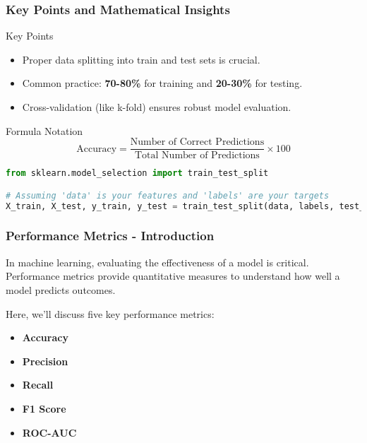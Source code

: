 \documentclass[aspectratio=169]{beamer}
\begin{document}
\begin{frame}[fragile]
    \frametitle{Key Points and Mathematical Insights}
    \begin{block}{Key Points}
        \begin{itemize}
            \item Proper data splitting into train and test sets is crucial.
            \item Common practice: \textbf{70-80\%} for training and \textbf{20-30\%} for testing.
            \item Cross-validation (like k-fold) ensures robust model evaluation.
        \end{itemize}
    \end{block}
    
    \begin{block}{Formula Notation}
        \begin{equation}
            \text{Accuracy} = \frac{\text{Number of Correct Predictions}}{\text{Total Number of Predictions}} \times 100
        \end{equation}
        
        \begin{lstlisting}[language=Python]
from sklearn.model_selection import train_test_split

# Assuming 'data' is your features and 'labels' are your targets
X_train, X_test, y_train, y_test = train_test_split(data, labels, test_size=0.25, random_state=42)
        \end{lstlisting}
    \end{block}
\end{frame}

\begin{frame}[fragile]
    \frametitle{Performance Metrics - Introduction}
    In machine learning, evaluating the effectiveness of a model is critical. Performance metrics provide quantitative measures to understand how well a model predicts outcomes. 
    
    Here, we'll discuss five key performance metrics: 
    \begin{itemize}
        \item \textbf{Accuracy}
        \item \textbf{Precision}
        \item \textbf{Recall}
        \item \textbf{F1 Score}
        \item \textbf{ROC-AUC}
    \end{itemize}
\end{frame}
\end{document}
